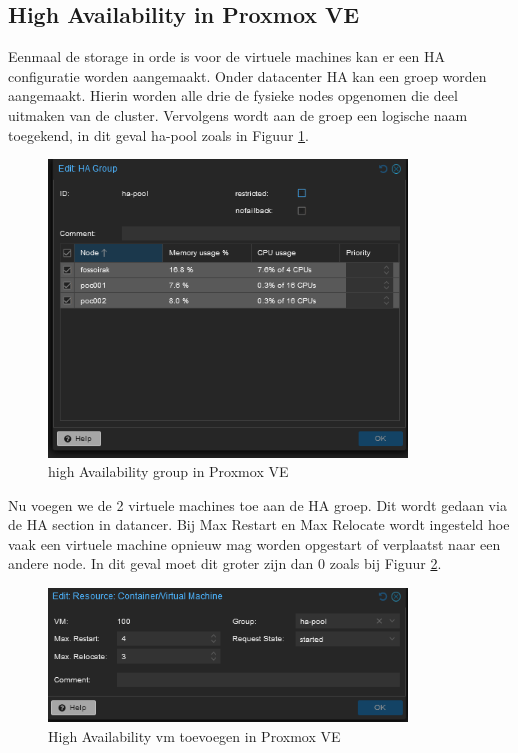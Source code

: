 \subsection{High Availability in Proxmox VE}
\label{sec:ha-proxmox}
Eenmaal de storage in orde is voor de virtuele machines kan er een HA configuratie worden aangemaakt. 
Onder datacenter HA kan een groep worden aangemaakt. Hierin worden alle drie de fysieke nodes opgenomen die deel uitmaken van de cluster. Vervolgens wordt aan de groep een logische naam toegekend, in dit geval ha-pool zoals in Figuur \ref{fig:ha-group}.
\begin{figure}[H]
  \centering
  \includegraphics[width=0.85\textwidth]{../poc/ha-group.png}
  \caption{high Availability group in Proxmox VE}
  \label{fig:ha-group}
\end{figure}
Nu voegen we de 2 virtuele machines toe aan de HA groep. Dit wordt gedaan via de HA section in datancer.
Bij Max Restart en Max Relocate wordt ingesteld hoe vaak een virtuele machine opnieuw mag worden opgestart of verplaatst naar een andere node. In dit geval moet dit groter zijn dan 0 zoals bij Figuur \ref{fig:ha-vm}.
\begin{figure}[H]
  \centering
  \includegraphics[width=0.85\textwidth]{../poc/vm-ha.png}
  \caption{High Availability vm toevoegen in Proxmox VE}
  \label{fig:ha-vm}
\end{figure}



